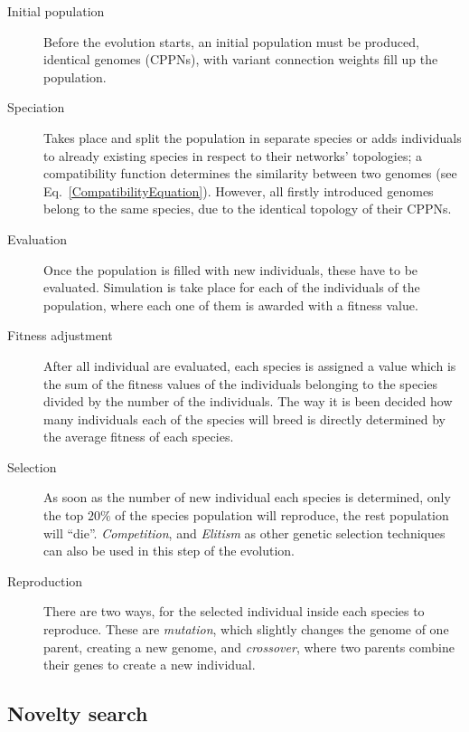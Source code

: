 \begin{description}
\item[Initial population]{Before the evolution starts, an initial population must be produced, identical genomes (CPPNs), with variant connection weights fill up the population.}

\item[Speciation]{Takes place and split the population in separate species or adds individuals to already existing species in respect to their networks' topologies; a compatibility function determines the similarity between two genomes (see Eq.~\ref{CompatibilityEquation}). However, all firstly introduced genomes belong to the same species, due to the identical topology of their CPPNs.}

\item[Evaluation] Once the population is filled with new individuals, these have to be evaluated. Simulation is take place for each of the individuals of the population, where each one of them is awarded with a fitness value.

\item[Fitness adjustment]{After all individual are evaluated, each species is assigned a value which is the sum of the fitness values of the individuals belonging to the species divided by the number of the individuals. The way it is been decided how many individuals each of the species will breed is directly determined by the average fitness of each species.}

\item[Selection]{As soon as the number of new individual each species is determined, only the top $20\%$ of the species population will reproduce, the rest population will ``die''. \emph{Competition}, and \emph{Elitism} as other genetic selection techniques can also be used in this step of the evolution.}

\item[Reproduction]{There are two ways, for the selected individual inside each species to reproduce. These are \emph{mutation}, which slightly changes the genome of one parent,  creating a new genome, and \emph{crossover}, where two parents combine their genes to create a new individual.}
\end{description}






\subsection{Novelty search}


